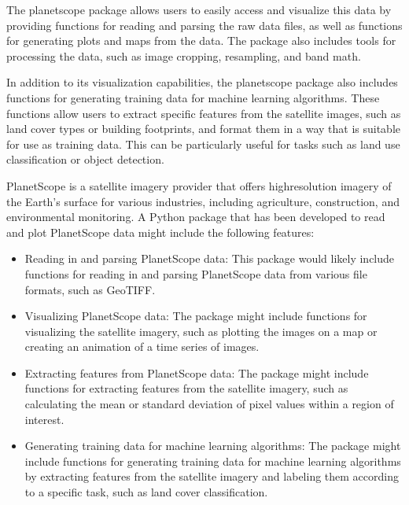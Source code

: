 \documentclass[letterpaper,10pt,english]{sphinxmanual}
\begin{document}
\sphinxAtStartPar
The planetscope package allows users to easily access and visualize this data by providing functions for reading and parsing the raw data files, as well as functions for generating plots and maps from the data. The package also includes tools for processing the data, such as image cropping, resampling, and band math.

\sphinxAtStartPar
In addition to its visualization capabilities, the planetscope package also includes functions for generating training data for machine learning algorithms. These functions allow users to extract specific features from the satellite images, such as land cover types or building footprints, and format them in a way that is suitable for use as training data. This can be particularly useful for tasks such as land use classification or object detection.

\sphinxAtStartPar
PlanetScope is a satellite imagery provider that offers high\sphinxhyphen{}resolution imagery of the Earth’s surface for various industries, including agriculture, construction, and environmental monitoring. A Python package that has been developed to read and plot PlanetScope data might include the following features:
\begin{itemize}
\item {} 
\sphinxAtStartPar
Reading in and parsing PlanetScope data: This package would likely include functions for reading in and parsing PlanetScope data from various file formats, such as GeoTIFF.

\item {} 
\sphinxAtStartPar
Visualizing PlanetScope data: The package might include functions for visualizing the satellite imagery, such as plotting the images on a map or creating an animation of a time series of images.

\item {} 
\sphinxAtStartPar
Extracting features from PlanetScope data: The package might include functions for extracting features from the satellite imagery, such as calculating the mean or standard deviation of pixel values within a region of interest.

\item {} 
\sphinxAtStartPar
Generating training data for machine learning algorithms: The package might include functions for generating training data for machine learning algorithms by extracting features from the satellite imagery and labeling them according to a specific task, such as land cover classification.

\end{itemize}
\end{document}
